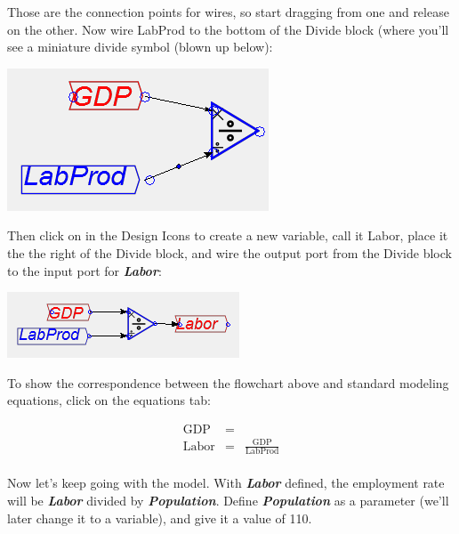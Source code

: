 Those are the connection points for wires, so start dragging from
one and release on the other. Now wire LabProd to the bottom of the
Divide block (where you'll see a miniature divide symbol (blown up
below):
\begin{center}
\includegraphics{images/NewItem76} 
\par\end{center}

Then click on  in the Design Icons to create
a new variable, call it Labor, place it the the right of the Divide
block, and wire the output port from the Divide block to the input
port for \textbf{\em Labor}:
\begin{center}
\includegraphics{images/NewItem79} 
\par\end{center}

To show the correspondence between the flowchart above and standard
modeling equations, click on the equations tab:

\begin{eqnarray*}
\mathrm{GDP} & =\\
\mathrm{Labor} & = & \frac{\mathrm{GDP}}{\mathrm{LabProd}}\\
\end{eqnarray*}

Now let's keep going with the model. With \textbf{\em Labor} defined,
the employment rate will be \textbf{\em Labor} divided by \textbf{\em
Population}. Define \textbf{\em Population} as a parameter (we'll
later change it to a variable), and give it a value of 110.
\begin{center}
\par\end{center}

